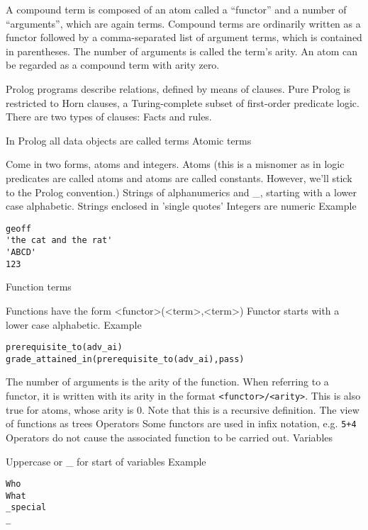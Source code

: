 \documentclass[thesis-solanki.tex]{subfiles}
\begin{document}
\begin{enumerate}
\begin{enumerate}
A compound term is composed of an atom called a ``functor'' and a number of ``arguments'', which are again terms. Compound terms are ordinarily 
written as a functor followed by a comma-separated list of argument terms, which is contained in parentheses. The number of arguments is 
called the term's arity. An atom can be regarded as a compound term with arity zero.

Prolog programs describe relations, defined by means of clauses. Pure Prolog is restricted to Horn clauses, a Turing-complete subset of 
first-order predicate logic. There are two types of clauses: Facts and rules.



\cite{website:prologintroumiami}
In Prolog
 all data objects are called terms
 Atomic terms

Come in two forms, atoms and integers.
Atoms (this is a misnomer as in logic predicates are called atoms and atoms are called constants. However, we'll stick to the Prolog convention.)
Strings of alphanumerics and \_, starting with a lower case alphabetic.
Strings enclosed in 'single quotes'
Integers are numeric
Example
\par
\begin{verbatim}
geoff
'the cat and the rat'
'ABCD'
123
\end{verbatim}
     
Function terms

Functions have the form <functor>(<term>{,<term>})
Functor starts with a lower case alphabetic.
Example
\par
\begin{verbatim}
prerequisite_to(adv_ai)
grade_attained_in(prerequisite_to(adv_ai),pass)
\end{verbatim}
     
The number of arguments is the arity of the function. When referring to a functor, it is written with its arity in
the format \Verb!<functor>/<arity>!. This is also true for atoms, whose arity is 0.
Note that this is a recursive definition.
The view of functions as trees
Operators
Some functors are used in infix notation, e.g. \Verb!5+4!
Operators do not cause the associated function to be carried out.
Variables

Uppercase or \_ for start of variables
Example
\par
\begin{verbatim}
Who
What
_special
_
\end{verbatim}
     

\end{enumerate}
\end{enumerate}
\end{document}
